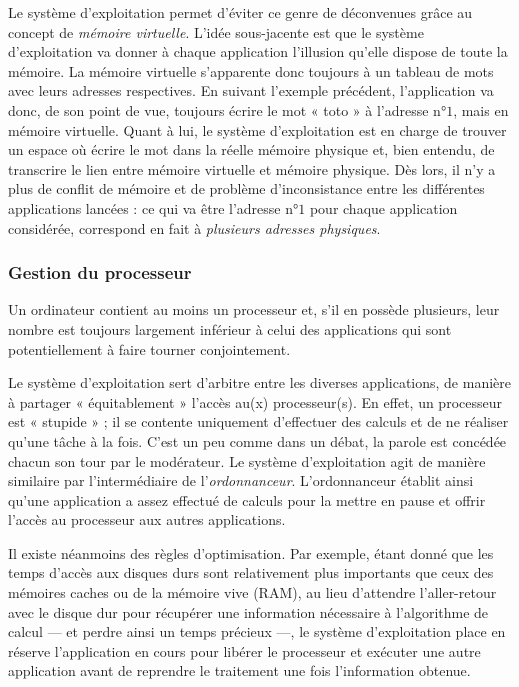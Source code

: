 Le système d'exploitation permet d'éviter ce genre de déconvenues grâce au concept de \emph{mémoire virtuelle}. 
L'idée sous-jacente est que le système d'exploitation va donner à chaque application l'illusion qu'elle dispose de toute la mémoire. La mémoire virtuelle s'apparente donc toujours à un tableau de mots avec leurs adresses respectives. En suivant l'exemple précédent, l'application va donc, de son point de vue, toujours écrire le mot « toto » à l'adresse n°$1$, mais en mémoire virtuelle. Quant à lui, le système d'exploitation est en charge de trouver un espace où écrire le mot dans la réelle mémoire physique et, bien entendu, de transcrire le lien entre mémoire virtuelle et mémoire physique. Dès lors, il n'y a plus de conflit de mémoire et de problème d'inconsistance entre les différentes applications lancées : ce qui va être l'adresse n°$1$ pour chaque application considérée, correspond en fait à \emph{plusieurs adresses physiques}.

\subsubsection[Gestion processeur]{Gestion du processeur}
\label{subsub:I.2.1.2}

Un ordinateur contient au moins un processeur et, s'il en possède plusieurs, leur nombre est toujours largement inférieur à celui des applications qui sont potentiellement à faire tourner conjointement.

Le système d'exploitation sert d'arbitre entre les diverses applications, de manière à partager « équitablement » l'accès au(x) processeur(s). En effet, un processeur est « stupide » ; il se contente uniquement d'effectuer des calculs et de ne réaliser qu'une tâche à la fois.
C'est un peu comme dans un débat, la parole est concédée chacun son tour par le modérateur. Le système d'exploitation agit de manière similaire par l'intermédiaire de l'\emph{ordonnanceur}. L'ordonnanceur établit ainsi qu'une application a assez effectué de calculs pour la mettre en pause et offrir l'accès au processeur aux autres applications.

Il existe néanmoins des règles d'optimisation. Par exemple, étant donné que les temps d'accès aux disques durs sont relativement plus importants que ceux des mémoires caches ou de la mémoire vive (RAM), au lieu d'attendre l'aller-retour avec le disque dur pour récupérer une information nécessaire à l'algorithme de calcul --- et perdre ainsi un temps précieux ---, le système d'exploitation place en réserve l'application en cours pour libérer le processeur et exécuter une autre application avant de reprendre le traitement une fois l'information obtenue.

